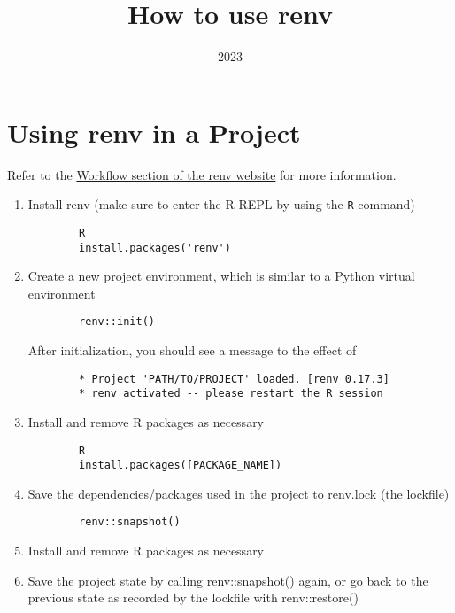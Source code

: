 \documentclass{article}
\title{How to use renv}
\date{2023}
\begin{document}
\maketitle
  
\tableofcontents

\section{Using renv in a Project}
Refer to the \href{https://rstudio.github.io/renv/articles/renv.html#workflow}{Workflow section of the renv website} for more information.

\begin{enumerate}
    \item Install renv (make sure to enter the R REPL by using the \verb|R| command)
    \begin{verbatim}
        R
        install.packages('renv')
    \end{verbatim}
    
    \item Create a new project environment, which is similar to a Python virtual environment
    \begin{verbatim}
        renv::init()
    \end{verbatim}
    
	After initialization, you should see a message to the effect of
	\begin{verbatim}
	    * Project 'PATH/TO/PROJECT' loaded. [renv 0.17.3]
	    * renv activated -- please restart the R session
    \end{verbatim}
    
    \item Install and remove R packages as necessary
    \begin{verbatim}
        R
        install.packages([PACKAGE_NAME])
    \end{verbatim}
    
    \item Save the dependencies/packages used in the project to renv.lock (the lockfile)
    \begin{verbatim}
        renv::snapshot()
    \end{verbatim}
    
    \item Install and remove R packages as necessary
    \item Save the project state by calling renv::snapshot() again, or go back to the previous state as recorded by the lockfile with renv::restore()
\end{enumerate}
\end{document}
